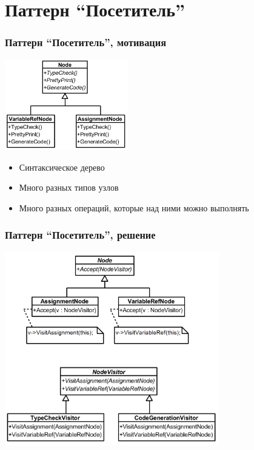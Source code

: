 \documentclass{../../slides-style}
\begin{document}
    \section{Паттерн ``Посетитель''}

    \begin{frame}
        \frametitle{Паттерн ``Посетитель'', мотивация}
        \begin{center}
            \includegraphics[width=0.4\textwidth]{visitorExample.png}
        \end{center}
        \begin{itemize}
            \item Синтаксическое дерево
            \item Много разных типов узлов
            \item Много разных операций, которые над ними можно выполнять
        \end{itemize}
    \end{frame}

    \begin{frame}
        \frametitle{Паттерн ``Посетитель'', решение}
        \begin{center}
            \includegraphics[width=0.7\textwidth]{visitorExampleSolution.png}
        \end{center}
    \end{frame}
\end{document}
